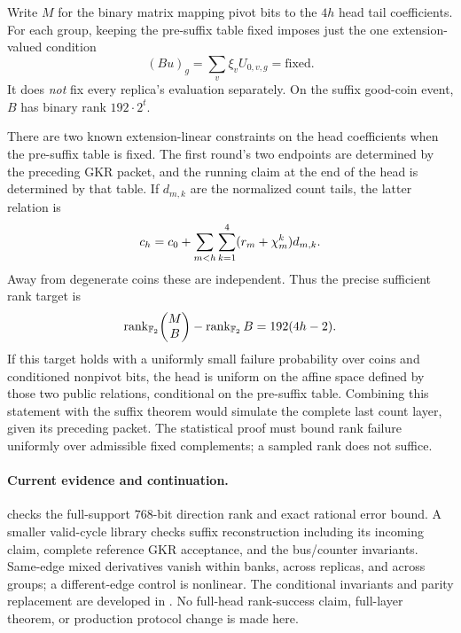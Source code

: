 \documentclass[11pt]{article}
\begin{document}
Write $M$ for the binary matrix mapping pivot bits to the $4h$ head tail coefficients. For each group, keeping the pre-suffix table fixed imposes just the one extension-valued condition
\[
 (Bu)_g=\sum_v\xi_vU_{0,v,g}=\text{fixed}.
\]
It does \emph{not} fix every replica's evaluation separately. On the suffix good-coin event, $B$ has binary rank $192\cdot2^t$.

There are two known extension-linear constraints on the head coefficients when the pre-suffix table is fixed. The first round's two endpoints are determined by the preceding GKR packet, and the running claim at the end of the head is determined by that table. If $d_{m,k}$ are the normalized count tails, the latter relation is
\[
 c_h=c_0+\sum_{m<h}\sum_{k=1}^4(r_m+\chi_m^k)d_{m,k}.
\]
Away from degenerate coins these are independent. Thus the precise sufficient rank target is
\[
 \operatorname{rank}_{\mathbb{F}_2}\!\begin{pmatrix}M\\B\end{pmatrix}
 -\operatorname{rank}_{\mathbb{F}_2}B
 =192(4h-2).
\]
If this target holds with a uniformly small failure probability over coins and conditioned nonpivot bits, the head is uniform on the affine space defined by those two public relations, conditional on the pre-suffix table. Combining this statement with the suffix theorem would simulate the complete last count layer, given its preceding packet. The statistical proof must bound rank failure uniformly over admissible fixed complements; a sampled rank does not suffice.

\paragraph{Current evidence and continuation.}  checks the full-support $768$-bit direction rank and exact rational error bound. A smaller valid-cycle library checks suffix reconstruction including its incoming claim, complete reference GKR acceptance, and the bus/counter invariants. Same-edge mixed derivatives vanish within banks, across replicas, and across groups; a different-edge control is nonlinear. The conditional invariants and parity replacement are developed in . No full-head rank-success claim, full-layer theorem, or production protocol change is made here.
\end{document}
